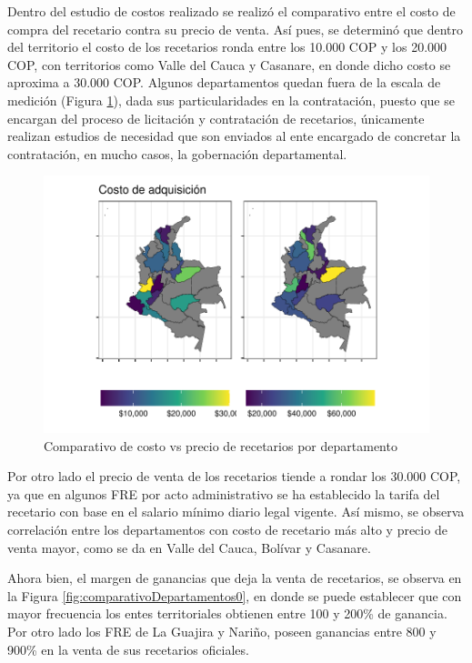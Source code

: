 \documentclass[
]{book}
\begin{document}
Dentro del estudio de costos realizado se realizó el comparativo entre el costo de compra del recetario contra su precio de venta. Así pues, se determinó que dentro del territorio el costo de los recetarios ronda entre los 10.000 COP y los 20.000 COP, con territorios como Valle del Cauca y Casanare, en donde dicho costo se aproxima a 30.000 COP. Algunos departamentos quedan fuera de la escala de medición (Figura \ref{fig:costoRecetario}), dada sus particularidades en la contratación, puesto que se encargan del proceso de licitación y contratación de recetarios, únicamente realizan estudios de necesidad que son enviados al ente encargado de concretar la contratación, en mucho casos, la gobernación departamental.

\begin{figure}
\includegraphics[width=0.9\linewidth]{InformeFinal_files/figure-latex/costoRecetario-1} \caption{Comparativo de costo vs precio de recetarios por departamento}\label{fig:costoRecetario}
\end{figure}

Por otro lado el precio de venta de los recetarios tiende a rondar los 30.000 COP, ya que en algunos FRE por acto administrativo se ha establecido la tarifa del recetario con base en el salario mínimo diario legal vigente. Así mismo, se observa correlación entre los departamentos con costo de recetario más alto y precio de venta mayor, como se da en Valle del Cauca, Bolívar y Casanare.

Ahora bien, el margen de ganancias que deja la venta de recetarios, se observa en la Figura \ref{fig:comparativoDepartamentos0}, en donde se puede establecer que con mayor frecuencia los entes territoriales obtienen entre 100 y 200\% de ganancia. Por otro lado los FRE de La Guajira y Nariño, poseen ganancias entre 800 y 900\% en la venta de sus recetarios oficiales.
\end{document}
